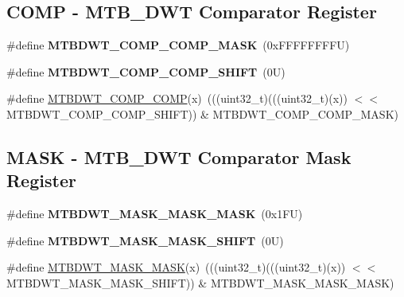 \subsection*{C\+O\+MP -\/ M\+T\+B\+\_\+\+D\+WT Comparator Register}
\begin{DoxyCompactItemize}
\item 
\mbox{\label{group___m_t_b_d_w_t___register___masks_ga95b185cf8a19b80b863058a837c0978d}} 
\#define {\bfseries M\+T\+B\+D\+W\+T\+\_\+\+C\+O\+M\+P\+\_\+\+C\+O\+M\+P\+\_\+\+M\+A\+SK}~(0x\+F\+F\+F\+F\+F\+F\+F\+F\+U)
\item 
\mbox{\label{group___m_t_b_d_w_t___register___masks_ga0ec26e5cefc95dac603a0b03b1ad0fdd}} 
\#define {\bfseries M\+T\+B\+D\+W\+T\+\_\+\+C\+O\+M\+P\+\_\+\+C\+O\+M\+P\+\_\+\+S\+H\+I\+FT}~(0\+U)
\item 
\#define \mbox{\hyperlink{group___m_t_b_d_w_t___register___masks_ga1c3d552767450157531a7ef5e1d02731}{M\+T\+B\+D\+W\+T\+\_\+\+C\+O\+M\+P\+\_\+\+C\+O\+MP}}(x)~(((uint32\+\_\+t)(((uint32\+\_\+t)(x)) $<$$<$ M\+T\+B\+D\+W\+T\+\_\+\+C\+O\+M\+P\+\_\+\+C\+O\+M\+P\+\_\+\+S\+H\+I\+FT)) \& M\+T\+B\+D\+W\+T\+\_\+\+C\+O\+M\+P\+\_\+\+C\+O\+M\+P\+\_\+\+M\+A\+SK)
\end{DoxyCompactItemize}
\subsection*{M\+A\+SK -\/ M\+T\+B\+\_\+\+D\+WT Comparator Mask Register}
\begin{DoxyCompactItemize}
\item 
\mbox{\label{group___m_t_b_d_w_t___register___masks_gaa4fcad7c638af9ad4f678c9b02fe083e}} 
\#define {\bfseries M\+T\+B\+D\+W\+T\+\_\+\+M\+A\+S\+K\+\_\+\+M\+A\+S\+K\+\_\+\+M\+A\+SK}~(0x1\+F\+U)
\item 
\mbox{\label{group___m_t_b_d_w_t___register___masks_ga2ebeb9592fd6b0121c2e3729f5afd2ff}} 
\#define {\bfseries M\+T\+B\+D\+W\+T\+\_\+\+M\+A\+S\+K\+\_\+\+M\+A\+S\+K\+\_\+\+S\+H\+I\+FT}~(0\+U)
\item 
\#define \mbox{\hyperlink{group___m_t_b_d_w_t___register___masks_ga3ac9e2ec6bbab5088938f5dcdd2f76db}{M\+T\+B\+D\+W\+T\+\_\+\+M\+A\+S\+K\+\_\+\+M\+A\+SK}}(x)~(((uint32\+\_\+t)(((uint32\+\_\+t)(x)) $<$$<$ M\+T\+B\+D\+W\+T\+\_\+\+M\+A\+S\+K\+\_\+\+M\+A\+S\+K\+\_\+\+S\+H\+I\+FT)) \& M\+T\+B\+D\+W\+T\+\_\+\+M\+A\+S\+K\+\_\+\+M\+A\+S\+K\+\_\+\+M\+A\+SK)
\end{DoxyCompactItemize}
